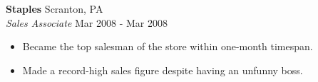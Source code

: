 \textbf{Staples} \hfill Scranton, PA\\
\textit{Sales Associate} \hfill Mar 2008 - Mar 2008\\
\vspace{-1mm}
\begin{itemize} \itemsep 1pt
	\item Became the top salesman of the store within one-month timespan.
	\item Made a record-high sales figure despite having an unfunny boss.
\end{itemize}
